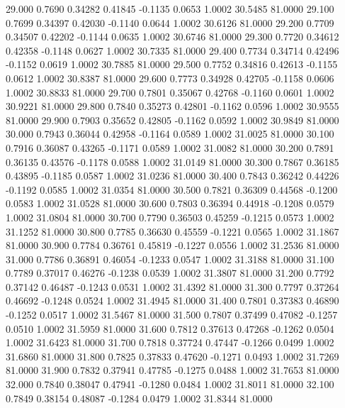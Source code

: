   29.000   0.7690   0.34282   0.41845  -0.1135   0.0653   1.0002  30.5485  81.0000
  29.100   0.7699   0.34397   0.42030  -0.1140   0.0644   1.0002  30.6126  81.0000
  29.200   0.7709   0.34507   0.42202  -0.1144   0.0635   1.0002  30.6746  81.0000
  29.300   0.7720   0.34612   0.42358  -0.1148   0.0627   1.0002  30.7335  81.0000
  29.400   0.7734   0.34714   0.42496  -0.1152   0.0619   1.0002  30.7885  81.0000
  29.500   0.7752   0.34816   0.42613  -0.1155   0.0612   1.0002  30.8387  81.0000
  29.600   0.7773   0.34928   0.42705  -0.1158   0.0606   1.0002  30.8833  81.0000
  29.700   0.7801   0.35067   0.42768  -0.1160   0.0601   1.0002  30.9221  81.0000
  29.800   0.7840   0.35273   0.42801  -0.1162   0.0596   1.0002  30.9555  81.0000
  29.900   0.7903   0.35652   0.42805  -0.1162   0.0592   1.0002  30.9849  81.0000
  30.000   0.7943   0.36044   0.42958  -0.1164   0.0589   1.0002  31.0025  81.0000
  30.100   0.7916   0.36087   0.43265  -0.1171   0.0589   1.0002  31.0082  81.0000
  30.200   0.7891   0.36135   0.43576  -0.1178   0.0588   1.0002  31.0149  81.0000
  30.300   0.7867   0.36185   0.43895  -0.1185   0.0587   1.0002  31.0236  81.0000
  30.400   0.7843   0.36242   0.44226  -0.1192   0.0585   1.0002  31.0354  81.0000
  30.500   0.7821   0.36309   0.44568  -0.1200   0.0583   1.0002  31.0528  81.0000
  30.600   0.7803   0.36394   0.44918  -0.1208   0.0579   1.0002  31.0804  81.0000
  30.700   0.7790   0.36503   0.45259  -0.1215   0.0573   1.0002  31.1252  81.0000
  30.800   0.7785   0.36630   0.45559  -0.1221   0.0565   1.0002  31.1867  81.0000
  30.900   0.7784   0.36761   0.45819  -0.1227   0.0556   1.0002  31.2536  81.0000
  31.000   0.7786   0.36891   0.46054  -0.1233   0.0547   1.0002  31.3188  81.0000
  31.100   0.7789   0.37017   0.46276  -0.1238   0.0539   1.0002  31.3807  81.0000
  31.200   0.7792   0.37142   0.46487  -0.1243   0.0531   1.0002  31.4392  81.0000
  31.300   0.7797   0.37264   0.46692  -0.1248   0.0524   1.0002  31.4945  81.0000
  31.400   0.7801   0.37383   0.46890  -0.1252   0.0517   1.0002  31.5467  81.0000
  31.500   0.7807   0.37499   0.47082  -0.1257   0.0510   1.0002  31.5959  81.0000
  31.600   0.7812   0.37613   0.47268  -0.1262   0.0504   1.0002  31.6423  81.0000
  31.700   0.7818   0.37724   0.47447  -0.1266   0.0499   1.0002  31.6860  81.0000
  31.800   0.7825   0.37833   0.47620  -0.1271   0.0493   1.0002  31.7269  81.0000
  31.900   0.7832   0.37941   0.47785  -0.1275   0.0488   1.0002  31.7653  81.0000
  32.000   0.7840   0.38047   0.47941  -0.1280   0.0484   1.0002  31.8011  81.0000
  32.100   0.7849   0.38154   0.48087  -0.1284   0.0479   1.0002  31.8344  81.0000
